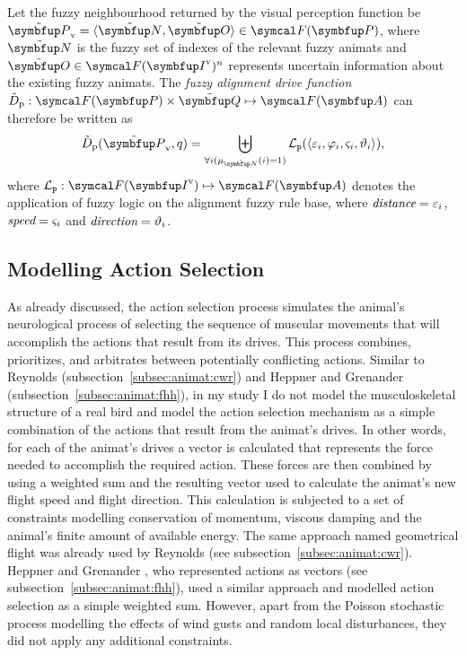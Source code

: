\begin{definition}
  \label{def:fuzzyAnimat:Dp:afd}
  Let the fuzzy neighbourhood returned by the visual perception function be $\fset{P}_\textnormal{v}=\langle \fset{N}, \fset{O} \rangle \in \fpowset{\set{P}}$, where $\fset{N}$ is the fuzzy set of indexes of the relevant fuzzy animats and $\fset{O} \in \fpowset{\set{I}^\textnormal{v}}^n$ represents uncertain information about the existing fuzzy animats. The \emph{fuzzy alignment drive function} $\ffunc{D}_\textnormal{p}: \fpowset{\set{P}} \times \fset{Q} \mapsto \fpowset{\set{A}}$ can therefore be written as
  \begin{equation}
    \ffunc{D}_\textnormal{p}(\fset{P}_\textnormal{v},q)=%
     \biguplus_{\forall i(\mu_\fset{N}(i)=1)} \mathcal{L}_\texttt{p}(\langle \varepsilon_i, \varphi_i, \varsigma_i, \vartheta_i \rangle),
  \end{equation}
  where $\mathcal{L}_\texttt{p}: \fpowset{\set{I}^\textnormal{v}} \mapsto \fpowset{\set{A}}$ denotes the application of fuzzy logic on the alignment fuzzy rule base, where $\emph{distance}=\varepsilon_i$, $\emph{speed}=\varsigma_i$ and $\emph{direction}=\vartheta_i$.
\end{definition}

\subsection{Modelling Action Selection}
As already discussed, the action selection process simulates the animal's neurological process of selecting the sequence of muscular movements that will accomplish the actions that result from its drives. This process combines, prioritizes, and arbitrates between potentially conflicting actions. Similar to Reynolds \cite{reynolds:1987,reynolds:1999} (subsection~\ref{subsec:animat:cwr}) and Heppner and Grenander \cite{heppner:1990} (subsection~\ref{subsec:animat:fhh}), in my study I do not model the musculoskeletal structure of a real bird and model the action selection mechanism as a simple combination of the actions that result from the animat's drives. In other words, for each of the animat's drives a vector is calculated that represents the force needed to accomplish the required action. These forces are then combined by using a weighted sum and the resulting vector used to calculate the animat's new flight speed and flight direction. This calculation is subjected to a set of constraints modelling conservation of momentum, viscous damping and the animal's finite amount of available energy. The same approach named geometrical flight was already used by Reynolds \cite{reynolds:1987,reynolds:1999} (see subsection~\ref{subsec:animat:cwr}). Heppner and Grenander \cite{heppner:1990}, who represented actions as vectors (see subsection~\ref{subsec:animat:fhh}), used a similar approach and modelled action selection as a simple weighted sum. However, apart from the Poisson stochastic process modelling the effects of wind gusts and random local disturbances, they did not apply any additional constraints.

